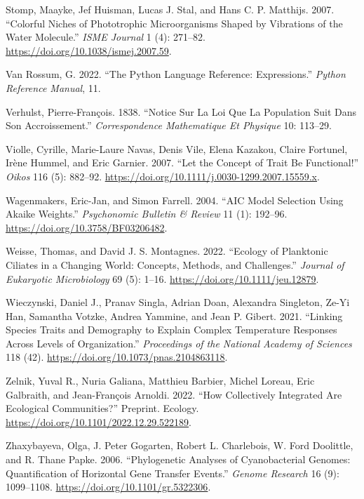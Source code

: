 \documentclass[
  letterpaper,
  DIV=11,
  numbers=noendperiod]{scrartcl}
\begin{document}
\begin{CSLReferences}
Stomp, Maayke, Jef Huisman, Lucas J. Stal, and Hans C. P. Matthijs.
2007. {``Colorful Niches of Phototrophic Microorganisms Shaped by
Vibrations of the Water Molecule.''} \emph{ISME Journal} 1 (4): 271--82.
\url{https://doi.org/10.1038/ismej.2007.59}.

Van Rossum, G. 2022. {``The Python Language Reference: {Expressions}.''}
\emph{Python Reference Manual}, 11.

Verhulst, Pierre-François. 1838. {``Notice Sur La Loi Que La Population
Suit Dans Son Accroissement.''} \emph{Correspondence Mathematique Et
Physique} 10: 113--29.

Violle, Cyrille, Marie-Laure Navas, Denis Vile, Elena Kazakou, Claire
Fortunel, Irène Hummel, and Eric Garnier. 2007. {``Let the Concept of
Trait Be Functional!''} \emph{Oikos} 116 (5): 882--92.
\url{https://doi.org/10.1111/j.0030-1299.2007.15559.x}.

Wagenmakers, Eric-Jan, and Simon Farrell. 2004. {``{AIC} Model Selection
Using {Akaike} Weights.''} \emph{Psychonomic Bulletin \& Review} 11 (1):
192--96. \url{https://doi.org/10.3758/BF03206482}.

Weisse, Thomas, and David J. S. Montagnes. 2022. {``Ecology of
Planktonic Ciliates in a Changing World: {Concepts}, Methods, and
Challenges.''} \emph{Journal of Eukaryotic Microbiology} 69 (5): 1--16.
\url{https://doi.org/10.1111/jeu.12879}.

Wieczynski, Daniel J., Pranav Singla, Adrian Doan, Alexandra Singleton,
Ze-Yi Han, Samantha Votzke, Andrea Yammine, and Jean P. Gibert. 2021.
{``Linking Species Traits and Demography to Explain Complex Temperature
Responses Across Levels of Organization.''} \emph{Proceedings of the
National Academy of Sciences} 118 (42).
\url{https://doi.org/10.1073/pnas.2104863118}.

Zelnik, Yuval R., Nuria Galiana, Matthieu Barbier, Michel Loreau, Eric
Galbraith, and Jean-François Arnoldi. 2022. {``How Collectively
Integrated Are Ecological Communities?''} Preprint. {Ecology}.
\url{https://doi.org/10.1101/2022.12.29.522189}.

Zhaxybayeva, Olga, J. Peter Gogarten, Robert L. Charlebois, W. Ford
Doolittle, and R. Thane Papke. 2006. {``Phylogenetic Analyses of
Cyanobacterial Genomes: {Quantification} of Horizontal Gene Transfer
Events.''} \emph{Genome Research} 16 (9): 1099--1108.
\url{https://doi.org/10.1101/gr.5322306}.

\end{CSLReferences}
\end{document}
